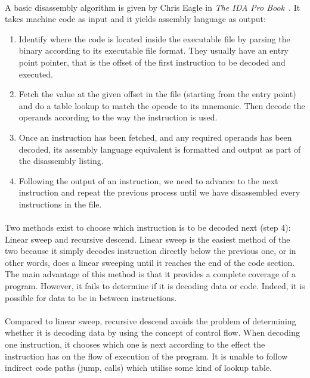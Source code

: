 \paragraph{}
A basic disassembly algorithm is given by Chris Eagle in \textit{The IDA Pro Book}~\cite{eagle2011ida}. It takes machine code as input and it yields assembly language as output:
\begin{enumerate}
	\item Identify where the code is located inside the executable file by parsing the binary according to its executable file format. They usually have an entry point pointer, that is the offset of the first instruction to be decoded and executed.
	\item Fetch the value at the given offset in the file (starting from the entry point) and do a table lookup to match the opcode to its mnemonic. Then decode the operands according to the way the instruction is used.
	\item Once an instruction has been fetched, and any required operands has been decoded, its assembly language equivalent is formatted and output as part of the disassembly listing.
	\item Following the output of an instruction, we need to advance to the next instruction and repeat the previous process until we have disassembled every instructions in the file.
\end{enumerate}

\paragraph{}
Two methods exist to choose which instruction is to be decoded next (step 4): Linear sweep and recursive descend. Linear sweep is the easiest method of the two because it simply decodes instruction directly below the previous one, or in other words, does a linear sweeping until it reaches the end of the code section. The main advantage of this method is that it provides a complete coverage of a program. However, it fails to determine if it is decoding data or code. Indeed, it is possible for data to be in between instructions.

\paragraph{}
Compared to linear sweep, recursive descend avoids the problem of determining whether it is decoding data by using the concept of control flow. When decoding one instruction, it chooses which one is next according to the effect the instruction has on the flow of execution of the program. It is unable to follow indirect code paths (jump, calls) which utilise some kind of lookup table.

